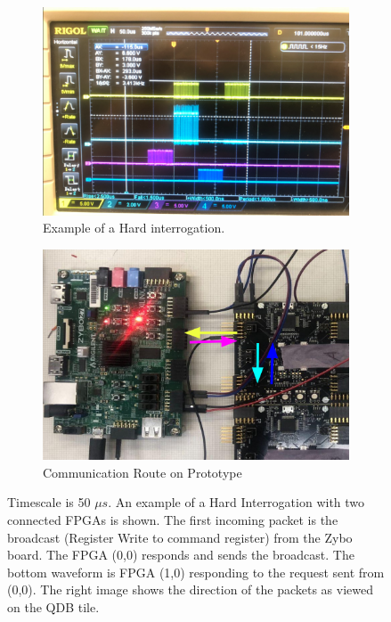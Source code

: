\begin{figure}
\centering
\begin{subfigure}{0.475\textwidth}
  \centering
  \includegraphics[width=\textwidth]{images/qdb_example_packet_waveform.png}
  \caption{Example of a Hard interrogation.}
\end{subfigure}%
\begin{subfigure}{0.475\textwidth}
  \centering
  \includegraphics[width=\textwidth]{images/qdb_example_packet_waveform_diagram.png}
  \caption{Communication Route on Prototype}
\end{subfigure}
\caption{Timescale is 50 $\unit{\mu s}$.
An example of a Hard Interrogation with two connected FPGAs is shown.
The first incoming packet is the broadcast (Register Write to command register) from the Zybo board.
The FPGA (0,0) responds and sends the broadcast.
The bottom waveform is FPGA (1,0) responding to the request sent from (0,0).
The right image shows the direction of the packets as viewed on the QDB tile.
}
\label{fig:example_broadcast}
\end{figure}

